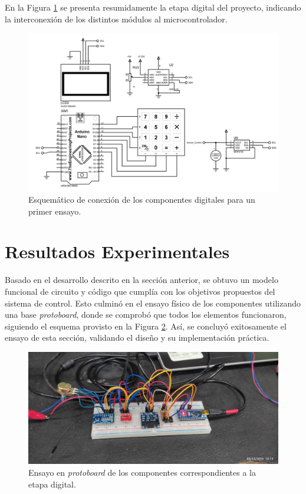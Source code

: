 En la Figura \ref{F:esquematico_proteus} se presenta resumidamente la etapa digital del proyecto, indicando la interconexión de los distintos módulos al microcontrolador.
\begin{figure}[H]
    \centering
    \includegraphics[width=\textwidth]{./imagenes/proteus_esquema2.jpg}
    \caption{Esquemático de conexión de los componentes digitales para un primer ensayo.}
    \label{F:esquematico_proteus}
\end{figure}

\section{Resultados Experimentales}
Basado en el desarrollo descrito en la sección anterior, se obtuvo un modelo funcional de circuito y código que cumplía con los objetivos propuestos del sistema de control. Esto culminó en el ensayo físico de los componentes utilizando una base \textit{protoboard}, donde se comprobó que todos los elementos funcionaron, siguiendo el esquema provisto en la Figura \ref{F:ensayo_digital}. Así, se concluyó exitosamente el ensayo de esta sección, validando el diseño y su implementación práctica.
\begin{figure}[H]
    \centering
    \includegraphics[scale=0.08]{./imagenes/ensayo_digital.jpg}
    \caption{Ensayo en \textit{protoboard} de los componentes correspondientes a la etapa digital.}
    \label{F:ensayo_digital}
\end{figure}

